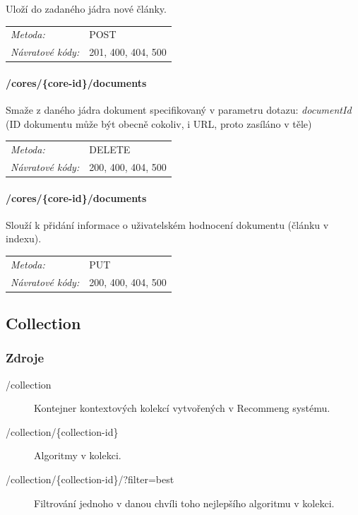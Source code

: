 \documentclass[thesis=M,czech]{FITthesis}[2014/05/07]
\begin{document}
Uloží do zadaného jádra nové články. 

\begin{center}
 	\begin{tabular}{lp{10cm}}
 		\textit{Metoda:}		& POST			\tabularnewline 
 		\textit{Návratové kódy:}		& 201, 400, 404, 500			\tabularnewline 		
 	\end{tabular}
\end{center} 	

\paragraph*{/cores/\{core-id\}/documents}

Smaže z daného jádra dokument specifikovaný v parametru dotazu: \emph{documentId} (ID dokumentu může být obecně cokoliv, i URL, proto zasíláno v těle)

\begin{center}
 	\begin{tabular}{lp{10cm}}
 		\textit{Metoda:}		& DELETE			\tabularnewline 
 		\textit{Návratové kódy:}		& 200, 400, 404, 500			\tabularnewline 		
 	\end{tabular}
\end{center} 	

\paragraph*{/cores/\{core-id\}/documents}

Slouží k přidání informace o uživatelském hodnocení dokumentu (článku v indexu).

\begin{center}
 	\begin{tabular}{lp{10cm}}
 		\textit{Metoda:}		& PUT			\tabularnewline 
 		\textit{Návratové kódy:}		& 200, 400, 404, 500		\tabularnewline 		
 	\end{tabular}
\end{center} 

\subsection{Collection}

\subsubsection{Zdroje}

\begin{description}
	\item[/collection] Kontejner kontextových kolekcí vytvořených v Recommeng systému.
	\item[/collection/\{collection-id\}] Algoritmy v kolekci.
	\item[/collection/\{collection-id\}/?filter=best] Filtrování jednoho v danou chvíli toho nejlepšího algoritmu v kolekci.
\end{description}
\end{document}
